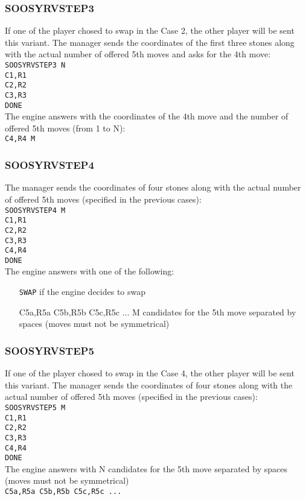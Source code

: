 \documentclass[12pt,a4paper]{article}
\begin{document}
\subsubsection{SOOSYRVSTEP3}
If one of the player chosed to swap in the Case 2, the other player will be sent this variant. The manager sends the coordinates of the first three stones along with the actual number of offered 5th moves and asks for the 4th move:\\
\texttt{SOOSYRVSTEP3 N}\\
\texttt{C1,R1}\\
\texttt{C2,R2}\\
\texttt{C3,R3}\\
\texttt{DONE}\\
The engine answers with the coordinates of the 4th move and the number of offered 5th moves (from 1 to N):\\
\texttt{C4,R4 \texttt{M}}

\subsubsection{SOOSYRVSTEP4}
The manager sends the coordinates of four stones along with the actual number of offered 5th moves (specified in the previous cases):\\
\texttt{SOOSYRVSTEP4 M}\\
\texttt{C1,R1}\\
\texttt{C2,R2}\\
\texttt{C3,R3}\\
\texttt{C4,R4}\\
\texttt{DONE}\\
The engine answers with one of the following:
\begin{enumerate}[leftmargin=7.5em]
\item[\texttt{SWAP}]{if the engine decides to swap}
\item[C5a,R5a C5b,R5b C5c,R5c ...]{M candidates for the 5th move separated by spaces (moves must not be symmetrical)}
\end{enumerate}

\subsubsection{SOOSYRVSTEP5}
If one of the player chosed to swap in the Case 4, the other player will be sent this variant. The manager sends the coordinates of four stones along with the actual number of offered 5th moves (specified in the previous cases):\\
\texttt{SOOSYRVSTEP5 M}\\
\texttt{C1,R1}\\
\texttt{C2,R2}\\
\texttt{C3,R3}\\
\texttt{C4,R4}\\
\texttt{DONE}\\
The engine answers with N candidates for the 5th move separated by spaces (moves must not be symmetrical)\\
\texttt{C5a,R5a C5b,R5b C5c,R5c ...}
\end{document}
